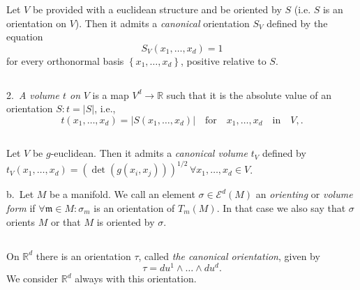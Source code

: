 \setcounter{example}{3}
\begin{example*}
Let $V$ be provided with a euclidean structure and be oriented by $S$
(i.e. $S$ is an orientation on $V$). Then it admits a {\em
canonical}\pageoriginale 
orientation $S_{V}$ defined by the equation
$$
S_{V}(x_{1},\ldots,x_{d})=1
$$
for every orthonormal basis $\left\{x_{1},\ldots,x_{d}\right\}$,
positive relative to $S$.
\end{example*}

\setcounter{subsection}{4}
\subsection{}\label{chap0:0.3.5}

2.~{\em A volume $t$ on} $V$ is a map $V^{d}\to \mathbb{R}$ such that
it is the absolute value of an orientation $S:t=|S|$, i.e.,
$$
t(x_{1},\ldots,x_{d})=|S(x_{1},\ldots,x_{d})|\quad\text{for}\quad
x_{1},\ldots,x_{d}\quad\text{in}\quad V,.
$$

\subsection{}\label{chap0:0.3.6}
\setcounter{example}{1}
\begin{example}\label{chap0:exam0.3.2}%
Let $V$ be $g$-euclidean. Then it admits a {\em canonical volume}
$t_{V}$ defined by
$t_{V}(x_{1},\ldots,x_{d})=(\det(g(x_{i},x_{j})))^{1/2} \, \forall
x_{1},\ldots,x_{d}\in V$.

b.~Let $M$ be a manifold. We call an element $\sigma\in
\mathscr{E}^{d}(M)$ an {\em orienting} or {\em volume form} if
$\forall \mathfrak{m}\in M:\sigma_{m}$ is an orientation of
$T_{m}(M)$. In that case we also say that $\sigma$ orients $M$ or that
$M$ is oriented by $\sigma$.
\end{example}

\subsection{}\label{chap0:0.3.7}

\setcounter{example}{6}
\begin{example*}
On $\mathbb{R}^{d}$ there is an orientation $\tau$, called {\em the
  canonical orientation}, given by
\begin{equation*}
\tau=d u^{1}\wedge\ldots\wedge d u^{d}.\tag{0.3.8}\label{chap0:0.3.8}
\end{equation*}
We consider $\mathbb{R}^{d}$ always with this orientation.
\end{example*}

